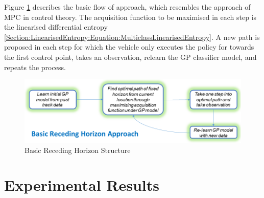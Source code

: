 \documentclass{article}
\begin{document}
		Figure \ref{Figure:Results:RecedingHorizonMethodOutline} describes the basic flow of approach, which resembles the approach of MPC in control theory. The acquisition function to be maximised in each step is the linearised differential entropy \eqref{Section:LinearisedEntropy:Equation:MulticlassLinearisedEntropy}. A new path is proposed in each step for which the vehicle only executes the policy for towards the first control point, takes an observation, relearn the GP classifier model, and repeats the process. 
		
		\begin{figure}[!htbp]
		\centering
			\includegraphics[width = \linewidth]{Figures/receding_horizon_informative_path_planning.png}
		\caption{Basic Receding Horizon Structure}
		\label{Figure:Results:RecedingHorizonMethodOutline}
		\end{figure}
		
\section{Experimental Results}
\label{Section:ExperimentalResults}
\end{document}
